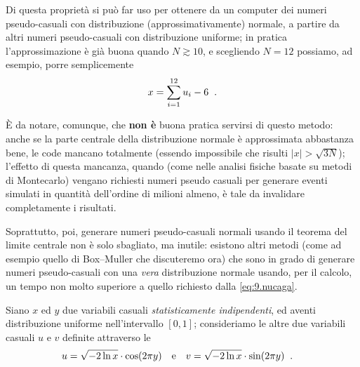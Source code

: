 Di questa propriet\`a si pu\`o far uso per ottenere da un
computer dei numeri pseudo-casuali con distribuzione
(approssimativamente) normale, a partire da altri numeri
pseudo-casuali con distribuzione uniforme; in pratica
l'approssimazione \`e gi\`a buona quando $N \gtrsim 10$, e
scegliendo $N=12$ possiamo, ad esempio, porre semplicemente
\begin{equation*}
  x = \sum_{i=1}^{12} u_i - 6 \;\; .
\end{equation*}

\`E da notare, comunque, che \textbf{non \`e} buona pratica
servirsi di questo metodo: anche se la parte centrale della
distribuzione normale \`e approssimata abbastanza bene, le
code mancano totalmente (essendo impossibile che risulti
$|x| > \sqrt{3N}$); l'effetto di questa mancanza, quando
(come nelle analisi fisiche basate su metodi di Montecarlo)
vengano richiesti numeri pseudo casuali per generare eventi
simulati in quantit\`a dell'ordine di milioni almeno, \`e
tale da invalidare completamente i risultati.

Soprattutto, poi, generare numeri pseudo-casuali normali
usando il teorema del limite centrale non \`e solo
sbagliato, ma inutile: esistono altri metodi (come ad
esempio quello di Box--Muller che discuteremo ora) che sono
in grado di generare numeri pseudo-casuali con una
\emph{vera} distribuzione normale usando, per il calcolo, un
tempo non molto superiore a quello richiesto dalla
\eqref{eq:9.nucaga}.

%
Siano $x$ ed $y$ due variabili casuali \emph{statisticamente
  indipendenti}, ed aventi distribuzione uniforme
nell'intervallo $[0,1]$; consideriamo le altre due variabili
casuali $u$ e $v$ definite attraverso le
\begin{align} \label{eq:9.boxmul}
  u &= \sqrt{-2 \ln x} \cdot \cos( 2 \pi y ) &&\text{e}
  & v &= \sqrt{-2 \ln x} \cdot \sin( 2 \pi y ) \;\; .
\end{align}

